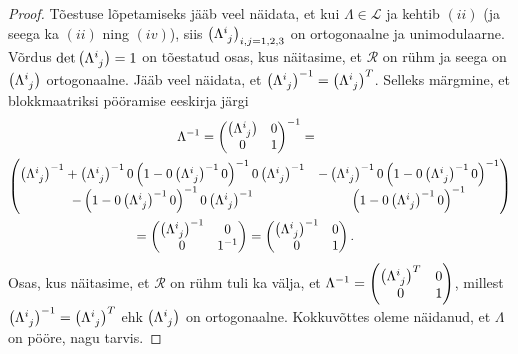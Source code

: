 \documentclass[12pt,a4paper,oneside]{article}
\theoremstyle{plain}
\theoremstyle{definition}
\numberwithin{equation}{section}
\def\L{{\mathcal L}}
\begin{document}
\begin{proof}
Tõestuse lõpetamiseks jääb veel näidata, et kui 
$\Lambda \in \L$ ja kehtib $(ii)$ (ja seega ka $(ii)$ ning 
$(iv)$), siis $\left(\Lambda\indices{^i_j}\right)_{i,j = 1, 2, 3}$ 
on ortogonaalne ja unimodulaarne. Võrdus 
$\det \left(\Lambda\indices{^i_j}\right) = 1$ on tõestatud osas, kus 
näitasime, et $\mathcal{R}$ on rühm ja seega on 
$\left(\Lambda\indices{^i_j}\right)$ ortogonaalne. 
Jääb veel näidata, et $\left(\Lambda\indices{^i_j}\right)^{-1} = 
\left(\Lambda\indices{^i_j}\right)^T$. Selleks märgmine, et 
blokkmaatriksi pööramise eeskirja järgi
\begin{align*}
\Lambda^{-1} = 
\begin{pmatrix}
\left(\Lambda\indices{^i_j}\right) & 0 \\
0 & 1 \\ 
\end{pmatrix}^{-1} = 
\qquad\qquad\qquad\qquad\qquad\qquad\qquad\quad\\
\begin{pmatrix}
\left(\Lambda\indices{^i_j}\right)^{-1} + 
\left(\Lambda\indices{^i_j}\right)^{-1} 0 
\left(1-0 \left(\Lambda\indices{^i_j}\right)
^{-1} 0 \right)^{-1} 0 \left(\Lambda\indices{^i_j}\right)^{-1} & 
-\left(\Lambda\indices{^i_j}\right)^{-1} 0 \left(1 - 0 \left
(\Lambda\indices{^i_j}\right)^{-1} 0 \right)^{-1} \\
-\left(1 - 0 \left(\Lambda\indices{^i_j}\right)^{-1} 0\right)^{-1} 0 
\left(\Lambda\indices{^i_j}\right)^{-1} & \left(1 - 0 \left
(\Lambda\indices{^i_j}\right)^{-1} 0 \right)^{-1} \\
\end{pmatrix} \\
 = \begin{pmatrix}
\left(\Lambda\indices{^i_j}\right)^{-1} & 0 \\
0 & 1^{-1} \\ 
\end{pmatrix} = 
\begin{pmatrix}
\left(\Lambda\indices{^i_j}\right)^{-1} & 0 \\
0 & 1 \\ 
\end{pmatrix}. \qquad\qquad\qquad\qquad\qquad\qquad
\end{align*}
Osas, kus näitasime, et $\mathcal{R}$ on rühm tuli ka välja, et 
$\Lambda^{-1} = \begin{pmatrix} \left(\Lambda\indices{^i_j}\right)^T 
& 0 \\ 0 & 1 \\ \end{pmatrix}$, millest 
$\left(\Lambda\indices{^i_j}\right)^{-1} = 
\left(\Lambda\indices{^i_j}\right)^T$ ehk 
$\left(\Lambda\indices{^i_j}\right)$ on ortogonaalne. Kokkuvõttes 
oleme näidanud, et $\Lambda$ on pööre, nagu tarvis.
\end{proof}
\end{document}
